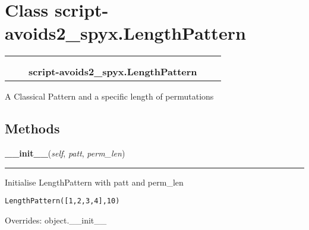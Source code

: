 %
%
%


\section{Class script-avoids2\_spyx.LengthPattern}

    \label{script-avoids2_spyx:LengthPattern}
\begin{tabular}{cccccc}
\multicolumn{2}{r}{\settowidth{\BCL}{object}\multirow{2}{\BCL}{object}}
&&
  \\\cline{3-3}
  &&\multicolumn{1}{c|}{}
&&
  \\
&&\multicolumn{2}{l}{\textbf{script-avoids2\_spyx.LengthPattern}}
\end{tabular}

A Classical Pattern and a specific length of permutations



  \subsection{Methods}

    \vspace{0.5ex}

\hspace{.8\funcindent}\begin{boxedminipage}{\funcwidth}

    \raggedright \textbf{\_\_init\_\_}(\textit{self}, \textit{patt}, \textit{perm\_len})

    \vspace{-1.5ex}

    \rule{\textwidth}{0.5\fboxrule}
\setlength{\parskip}{2ex}
    Initialise LengthPattern with patt and perm\_len

\begin{alltt}
\pysrcprompt{{\textgreater}{\textgreater}{\textgreater} }LengthPattern([1,2,3,4], 10)
\end{alltt}
\setlength{\parskip}{1ex}
      Overrides: object.\_\_init\_\_

    \end{boxedminipage}

